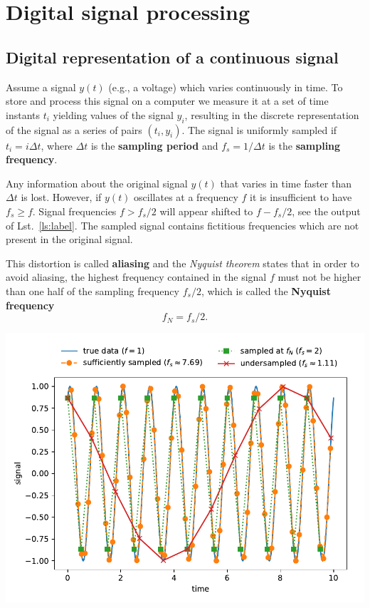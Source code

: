 \newpage
\section{Digital signal processing}
\subsection{Digital representation of a continuous signal}
Assume a signal $y(t)$ (e.g., a voltage) which varies continuously in time. To store and process this signal on a computer we measure it at a set of time instants $t_i$ yielding values of the signal $y_i$, resulting in the discrete representation of the signal as a series of pairs $(t_i, y_i)$. The signal is uniformly sampled if $t_i = i\Delta t$, where $\Delta t$ is the \textbf{sampling period} and $f_s = 1/\Delta t$ is the \textbf{sampling frequency}.

Any information about the original signal $y(t)$ that varies in time faster than $\Delta t$ is lost. However, if $y(t)$ oscillates at a frequency $f$ it is insufficient to have $f_s \geq f$. Signal frequencies $f > f_s/2$ will appear shifted to $f - f_s/2$, see the output of Lst.~\ref{ls:label}. The sampled signal contains fictitious frequencies which are not present in the original signal. 

This distortion is called \textbf{aliasing} and the \emph{Nyquist theorem} states that in order to avoid aliasing, the highest frequency contained in the signal $f$ must not be higher than one half of the sampling frequency $f_s/2$, which is called the \textbf{Nyquist frequency} 
\begin{equation}
    \label{eq:nqyust}
    f_N = f_s/2.
\end{equation}


\begin{center}
    \includegraphics[width=0.75\linewidth]{sampling.pdf}
\end{center}

